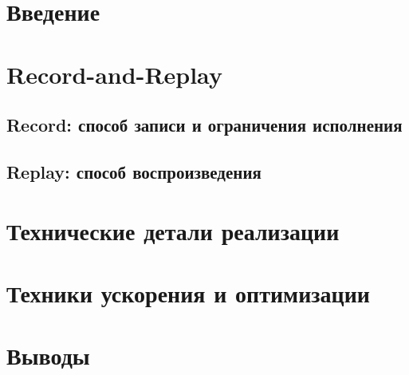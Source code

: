 



\sloppy

\maketitle

\section{Введение}


\section{Record-and-Replay}

\subsection{Record: способ записи и ограничения исполнения}


\subsection{Replay: способ воспроизведения}


\section{Технические детали реализации}


\section{Техники ускорения и оптимизации}


\section{Выводы}


